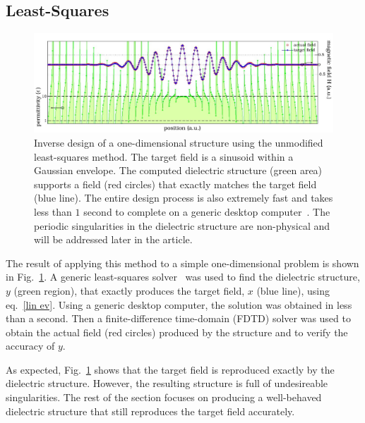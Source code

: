 \subsection{Least-Squares}
\begin{figure}[htbp]\centering
\includegraphics[width=\textwidth]{p1/leastsquares}
\caption{Inverse design of a one-dimensional structure using the unmodified least-squares method. The target field is a sinusoid within a Gaussian envelope. The computed dielectric structure (green area) supports a field (red circles) that exactly matches the target field (blue line). The entire design process is also extremely fast and takes less than $1$ second to complete on a generic desktop computer~\cite{mycomp}. The periodic singularities in the dielectric structure are non-physical and will be addressed later in the article.}
\label{ls pic}\end{figure}
The result of applying this method to a simple one-dimensional problem is shown in Fig.~\ref{ls pic}. A generic least-squares solver~\cite{cholmod} was used to find the dielectric structure, $y$ (green region), that exactly produces the target field, $x$ (blue line), using eq.~\eqref{lin ev}. Using a generic desktop computer, the solution was obtained in less than a second. Then a finite-difference time-domain (FDTD) solver was used to obtain the actual field (red circles) produced by the structure and to verify the accuracy of $y$.  

As expected, Fig.~\ref{ls pic} shows that the target field is reproduced exactly by the dielectric structure. However, the resulting structure is full of undesireable singularities. The rest of the section focuses on producing a well-behaved dielectric structure that still reproduces the target field accurately.

